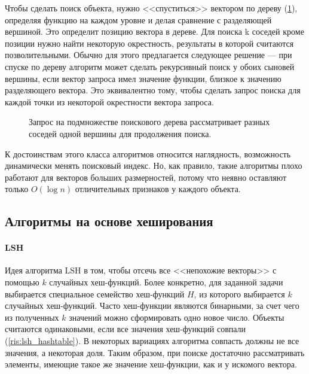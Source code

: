 \documentclass[a4paper,12pt]{extarticle}
\begin{document}
Чтобы сделать поиск объекта, нужно <<спуститься>> вектором по дереву (\cref{ris:annoy_tree}), определяя функцию на каждом уровне и делая сравнение с разделяющей вершиной. Это определит позицию вектора в дереве. Для поиска k соседей кроме позиции нужно найти некоторую окрестность, результаты в которой считаются позволительными. Обычно для этого предлагается следующее решение --- при спуске по дереву алгоритм может сделать рекурсивный поиск у обоих сыновей вершины, если вектор запроса имел значение функции, близкое к значению разделяющего вектора. Это эквивалентно тому, чтобы сделать запрос поиска для каждой точки из некоторой окрестности вектора запроса.

\begin{center}
\begin{figure}[H]
\caption{Запрос на подмножестве поискового дерева рассматривает разных соседей одной вершины для продолжения поиска.}
\label{ris:annoy_tree}
\end{figure}
\end{center}

К достоинствам этого класса алгоритмов относится наглядность, возможность динамически менять поисковый индекс. Но, как правило, такие алгоритмы плохо работают для векторов больших размерностей, потому что неявно оставляют только $O(\log n)$ отличительных признаков у каждого объекта.

\subsection{Алгоритмы на основе хеширования}

\paragraph{LSH}

\label{LSH}

Идея алгоритма LSH \cite{gionis1999similarity} в том, чтобы отсечь все <<непохожие векторы>> с помощью $k$ случайных хеш-функций. Более конкретно, для заданной задачи выбирается специальное семейство хеш-функций $H$, из которого выбирается $k$ случайных хеш-функций. Часто хеш-функции являются бинарными, за счет чего из полученных $k$ значений можно сформировать одно новое число. Объекты считаются одинаковыми, если все значения хеш-функций совпали (\cref{ris:lsh_hashtable}). В некоторых вариациях алгоритма совпасть должны не все значения, а некоторая доля. Таким образом, при поиске достаточно рассматривать элементы, имеющие такое же значение хеш-функции, как и у искомого вектора.
\end{document}
